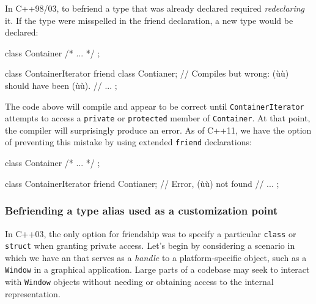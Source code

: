 In C++98/03, to befriend a type that was already declared required
\emph{redeclaring} it. If the type were misspelled in the friend
declaration, a new type would be declared:

\begin{emcppslisting}
class Container { /* ... */ };

class ContainerIterator
{
    friend class Contianer;  // Compiles but wrong: (ù{}ù) should have been (ù{}ù).
    // ...
};
\end{emcppslisting}
    
\noindent The code above will compile and appear to be correct until
\lstinline!ContainerIterator! attempts to access a \lstinline!private! or
\lstinline!protected! member of \lstinline!Container!. At that point, the
compiler will surprisingly produce an error. As of C++11, we have the
option of preventing this mistake by using extended \lstinline!friend!
declarations:

\begin{emcppslisting}
class Container { /* ... */ };

class ContainerIterator
{
    friend Contianer;  // Error, (ù{}ù) not found
    // ...
};
\end{emcppslisting}
    

\subsubsection[Befriending a type alias used as a customization point]{Befriending a type alias used as a customization point}\label{befriending-a-type-alias-used-as-a-customization-point}

In C++03, the only option for friendship was to specify a particular
\lstinline!class! or \lstinline!struct! when granting private access. Let's
begin by considering a scenario in which we have an
 
that serves as a \emph{handle} to a platform-specific object, such as a
\lstinline!Window! in a graphical application. Large parts of a codebase
may seek to interact with \lstinline!Window! objects without needing or
obtaining access to the internal representation.

